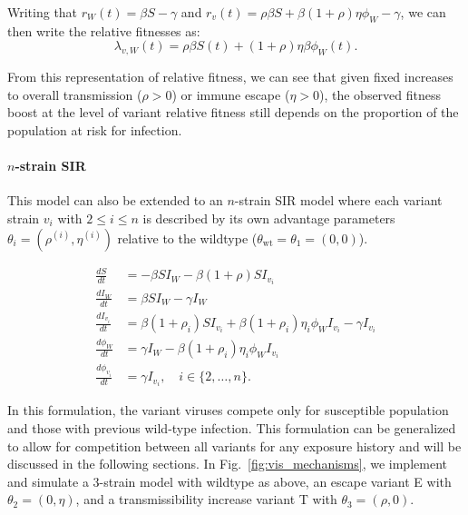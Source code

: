 \documentclass[11pt,oneside,letterpaper]{article}
\newcommand{\wt}{W}
\newcommand{\varEscape}{\eta}
\newcommand{\varTransmission}{\rho}
\begin{document}
Writing that $r_{\wt}(t) = \beta S - \gamma$ and $r_{v}(t) = \varTransmission \beta  S + \beta (1+\varTransmission) \varEscape \phi_{\wt} - \gamma$, we can then write the relative fitnesses as:
\begin{equation} \label{eq:two_strain_relative_fitness}
\lambda_{v,\wt}(t) = \varTransmission\beta S(t) + (1+\varTransmission) \varEscape \beta \phi_{\wt}(t).
\end{equation}

From this representation of relative fitness, we can see that given fixed increases to overall transmission ($\varTransmission > 0$) or immune escape ($\varEscape > 0$), the observed fitness boost at the level of variant relative fitness still depends on the proportion of the population at risk for infection.

\paragraph{$n$-strain SIR}%

This model can also be extended to an $n$-strain SIR model where each variant strain $v_i$ with $2\leq i \leq n$ is described by its own advantage parameters $\theta_{i} = (\varTransmission^{(i)}, \varEscape ^{(i)})$  relative to the wildtype ($\theta_{\text{wt}} = \theta_{1} = (0, 0)$).

\begin{align*}
    \frac{d S}{d t} &= - \beta S I_{\wt} - \beta (1+\varTransmission) S I_{v_{i}}\\
    \frac{d I_{\wt}}{dt} &= \beta S I_{\wt} - \gamma I_{\wt}\\
    \frac{d I_{v_{i}}}{dt} &= \beta (1+\varTransmission_i) S I_{v_{i}} + \beta (1+\varTransmission_i) \varEscape_i \phi_{\wt} I_{v_{i}} - \gamma I_{v_{i}}\\
    \frac{d \phi_{\wt}}{dt} &= \gamma I_{\wt} - \beta (1+\varTransmission_i) \varEscape_i \phi_{\wt} I_{v_{i}}\\
    \frac{d \phi_{v_{i}}}{dt} &= \gamma I_{v_{i}}, \quad i \in \{2, \ldots, n\}.
\end{align*}

In this formulation, the variant viruses compete only for susceptible population and those with previous wild-type infection.
This formulation can be generalized to allow for competition between all variants for any exposure history and will be discussed in the following sections.
In Fig.~\ref{fig:vis_mechanisms}, we implement and simulate a 3-strain model with wildtype as above, an escape variant E with $\theta_{2} = (0, \varEscape)$, and a transmissibility increase variant T with $\theta_{3} = (\varTransmission, 0)$.
\end{document}

